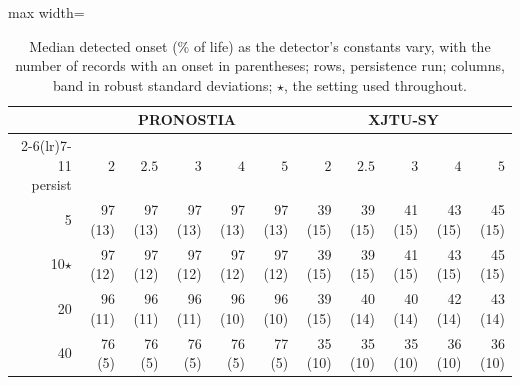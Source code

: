 \begin{table}[htbp]
\centering\small
\caption{Median detected onset (\% of life) as the detector's constants vary, with the
number of records with an onset in parentheses; rows, persistence run; columns, band in robust
standard deviations; $\star$, the setting used throughout.}
\label{tab:onsetsens}
\begin{adjustbox}{max width=\linewidth}
\begin{tabular}{@{}r rrrrr rrrrr@{}}
\toprule
& \multicolumn{5}{c}{PRONOSTIA} & \multicolumn{5}{c}{XJTU-SY}\\
\cmidrule(lr){2-6}\cmidrule(lr){7-11}
persist & $2$ & $2.5$ & $3$ & $4$ & $5$ & $2$ & $2.5$ & $3$ & $4$ & $5$\\
\midrule
5 & 97 (13) & 97 (13) & 97 (13) & 97 (13) & 97 (13) & 39 (15) & 39 (15) & 41 (15) & 43 (15) & 45 (15)\\
10$\star$ & 97 (12) & 97 (12) & 97 (12) & 97 (12) & 97 (12) & 39 (15) & 39 (15) & 41 (15) & 43 (15) & 45 (15)\\
20 & 96 (11) & 96 (11) & 96 (11) & 96 (10) & 96 (10) & 39 (15) & 40 (14) & 40 (14) & 42 (14) & 43 (14)\\
40 & 76 (5) & 76 (5) & 76 (5) & 76 (5) & 77 (5) & 35 (10) & 35 (10) & 35 (10) & 36 (10) & 36 (10)\\
\bottomrule
\end{tabular}
\end{adjustbox}
\end{table}
